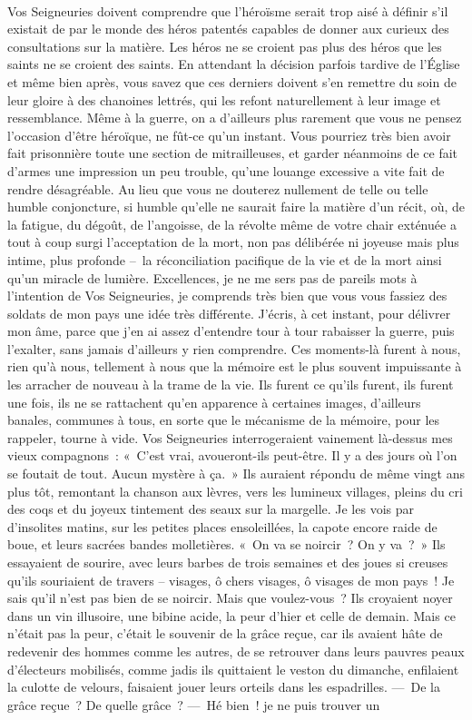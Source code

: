 \documentclass[french,twoside]{book} %
\begin{document}
\noindent  \par
Vos Seigneuries doivent comprendre que l’héroïsme serait trop aisé à définir s’il existait de par le monde des héros patentés capables de donner aux curieux des consultations sur la matière. Les héros ne se croient pas plus des héros que les saints ne se croient des saints. En attendant la décision parfois tardive de l’Église et même bien après, vous savez que ces derniers doivent s’en remettre du soin de leur gloire à des chanoines lettrés, qui les refont naturellement à leur image et ressemblance. Même à la guerre, on a d’ailleurs plus rarement que vous ne pensez l’occasion d’être héroïque, ne fût-ce qu’un instant. Vous pourriez très bien avoir fait prisonnière toute une section de mitrailleuses, et garder néanmoins de ce fait d’armes une impression un peu trouble, qu’une louange excessive a vite fait de rendre désagréable. Au lieu que vous ne douterez nullement de telle ou telle humble conjoncture, si humble qu’elle ne saurait faire la matière d’un récit, où, de la fatigue, du dégoût, de l’angoisse, de la révolte même de votre chair exténuée a tout à coup surgi l’acceptation de la mort, non pas délibérée ni joyeuse mais plus intime, plus profonde – la réconciliation pacifique de la vie et de la mort ainsi qu’un miracle de lumière. Excellences, je ne me sers pas de pareils mots à l’intention de Vos Seigneuries, je comprends très bien que vous vous fassiez des soldats de mon pays une idée très différente. J’écris, à cet instant, pour délivrer mon âme, parce que j’en ai assez d’entendre tour à tour rabaisser la guerre, puis l’exalter, sans jamais d’ailleurs y rien comprendre. Ces moments-là furent à nous, rien qu’à nous, tellement à nous que la mémoire est le plus souvent impuissante à les arracher de nouveau à la trame de la vie. Ils furent ce qu’ils furent, ils furent une fois, ils ne se rattachent qu’en apparence à certaines images, d’ailleurs banales, communes à tous, en sorte que le mécanisme de la mémoire, pour les rappeler, tourne à vide. Vos Seigneuries interrogeraient vainement là-dessus mes vieux compagnons : « C’est vrai, avoueront-ils peut-être. Il y a des jours où l’on se foutait de tout. Aucun mystère à ça. » Ils auraient répondu de même vingt ans plus tôt, remontant la chanson aux lèvres, vers les lumineux villages, pleins du cri des coqs et du joyeux tintement des seaux sur la margelle. Je les vois par d’insolites matins, sur les petites places ensoleillées, la capote encore raide de boue, et leurs sacrées bandes molletières. « On va se noircir ? On y va ? » Ils essayaient de sourire, avec leurs barbes de trois semaines et des joues si creuses qu’ils souriaient de travers – visages, ô chers visages, ô visages de mon pays ! Je sais qu’il n’est pas bien de se noircir. Mais que voulez-vous ? Ils croyaient noyer dans un vin illusoire, une bibine acide, la peur d’hier et celle de demain. Mais ce n’était pas la peur, c’était le souvenir de la grâce reçue, car ils avaient hâte de redevenir des hommes comme les autres, de se retrouver dans leurs pauvres peaux d’électeurs mobilisés, comme jadis ils quittaient le veston du dimanche, enfilaient la culotte de velours, faisaient jouer leurs orteils dans les espadrilles. — De la grâce reçue ? De quelle grâce ? — Hé bien ! je ne puis trouver un 
\end{document}
